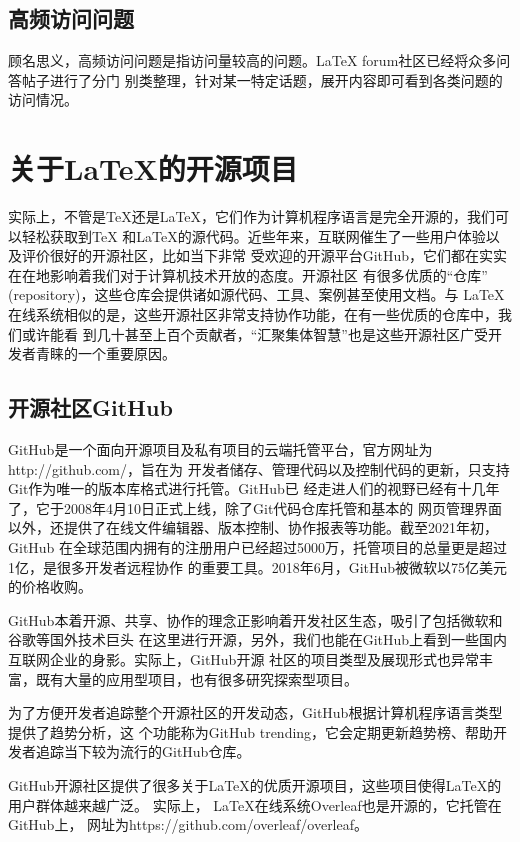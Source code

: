 \subsection{高频访问问题}
顾名思义，高频访问问题是指访问量较高的问题。LaTeX forum社区已经将众多问答帖子进行了分门
别类整理，针对某一特定话题，展开内容即可看到各类问题的访问情况。

\section{关于\LaTeX 的开源项目}
实际上，不管是TeX还是LaTeX，它们作为计算机程序语言是完全开源的，我们可以轻松获取到TeX
和LaTeX的源代码。近些年来，互联网催生了一些用户体验以及评价很好的开源社区，比如当下非常
受欢迎的开源平台GitHub，它们都在实实在在地影响着我们对于计算机技术开放的态度。开源社区
有很多优质的“仓库” (repository)，这些仓库会提供诸如源代码、工具、案例甚至使用文档。与
LaTeX在线系统相似的是，这些开源社区非常支持协作功能，在有一些优质的仓库中，我们或许能看
到几十甚至上百个贡献者，“汇聚集体智慧”也是这些开源社区广受开发者青睐的一个重要原因。

\subsection{开源社区GitHub}
GitHub是一个面向开源项目及私有项目的云端托管平台，官方网址为http://github.com/，旨在为
开发者储存、管理代码以及控制代码的更新，只支持Git作为唯一的版本库格式进行托管。GitHub已
经走进人们的视野已经有十几年了，它于2008年4月10日正式上线，除了Git代码仓库托管和基本的
网页管理界面以外，还提供了在线文件编辑器、版本控制、协作报表等功能。截至2021年初，GitHub
在全球范围内拥有的注册用户已经超过5000万，托管项目的总量更是超过1亿，是很多开发者远程协作
的重要工具。2018年6月，GitHub被微软以75亿美元的价格收购。

GitHub本着开源、共享、协作的理念正影响着开发社区生态，吸引了包括微软和谷歌等国外技术巨头
在这里进行开源，另外，我们也能在GitHub上看到一些国内互联网企业的身影。实际上，GitHub开源
社区的项目类型及展现形式也异常丰富，既有大量的应用型项目，也有很多研究探索型项目。

为了方便开发者追踪整个开源社区的开发动态，GitHub根据计算机程序语言类型提供了趋势分析，这
个功能称为GitHub trending，它会定期更新趋势榜、帮助开发者追踪当下较为流行的GitHub仓库。

GitHub开源社区提供了很多关于LaTeX的优质开源项目，这些项目使得LaTeX的用户群体越来越广泛。
实际上， LaTeX在线系统Overleaf也是开源的，它托管在GitHub上，
网址为https://github.com/overleaf/overleaf。


